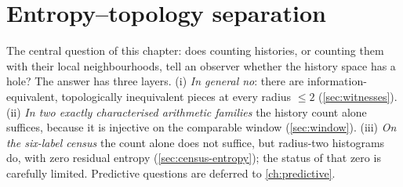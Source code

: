\chapter{Entropy--topology separation}\label{ch:separation}

The central question of this chapter: does counting histories, or counting them with their local neighbourhoods, tell an observer whether the history space has a hole? The answer has three layers. (i) \emph{In general no}: there are information-equivalent, topologically inequivalent pieces at every radius $\le2$ (\cref{sec:witnesses}). (ii) \emph{In two exactly characterised arithmetic families} the history count alone suffices, because it is injective on the comparable window (\cref{sec:window}). (iii) \emph{On the six-label census} the count alone does not suffice, but radius-two histograms do, with zero residual entropy (\cref{sec:census-entropy}); the status of that zero is carefully limited. Predictive questions are deferred to \cref{ch:predictive}.

